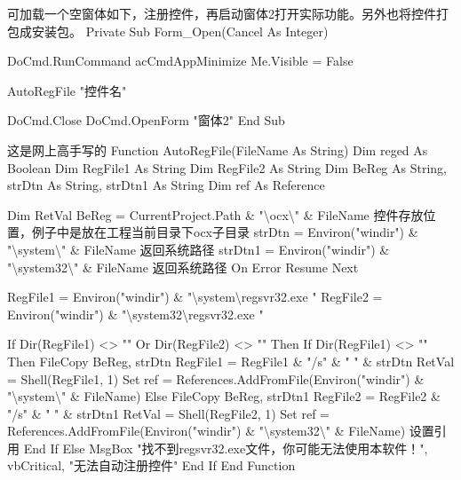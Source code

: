 \documentclass[
]{article}
\newenvironment{Shaded}{}{}
\newcommand{\NormalTok}[1]{#1}
\begin{document}
\begin{Shaded}
\begin{Highlighting}[]
\NormalTok{可加载一个空窗体如下，注册控件，再启动窗体2打开实际功能。另外也将控件打包成安装包。}
\NormalTok{Private Sub Form\_Open(Cancel As Integer)}

\NormalTok{    DoCmd.RunCommand acCmdAppMinimize}
\NormalTok{    Me.Visible = False}

\NormalTok{    AutoRegFile "控件名"}

\NormalTok{    DoCmd.Close}
\NormalTok{    DoCmd.OpenForm "窗体2"}
\NormalTok{End Sub}

\NormalTok{\textquotesingle{}这是网上高手写的}
\NormalTok{Function AutoRegFile(FileName As String)}
\NormalTok{    Dim reged As Boolean}
\NormalTok{    Dim RegFile1 As String}
\NormalTok{    Dim RegFile2 As String}
\NormalTok{    Dim BeReg As String, strDtn As String, strDtn1 As String}
\NormalTok{    Dim ref As Reference}

\NormalTok{    Dim RetVal}
\NormalTok{    BeReg = CurrentProject.Path \& "\textbackslash{}ocx\textbackslash{}" \& FileName          \textquotesingle{}控件存放位置，例子中是放在工程当前目录下ocx子目录}
\NormalTok{    strDtn = Environ("windir") \& "\textbackslash{}system\textbackslash{}" \& FileName           \textquotesingle{}返回系统路径}
\NormalTok{    strDtn1 = Environ("windir") \& "\textbackslash{}system32\textbackslash{}" \& FileName           \textquotesingle{}返回系统路径}
\NormalTok{    On Error Resume Next}

\NormalTok{    RegFile1 = Environ("windir") \& "\textbackslash{}system\textbackslash{}regsvr32.exe "}
\NormalTok{    RegFile2 = Environ("windir") \& "\textbackslash{}system32\textbackslash{}regsvr32.exe "}

\NormalTok{    If Dir(RegFile1) \textless{}\textgreater{} "" Or Dir(RegFile2) \textless{}\textgreater{} "" Then}
\NormalTok{        If Dir(RegFile1) \textless{}\textgreater{} "" Then}
\NormalTok{            FileCopy BeReg, strDtn}
\NormalTok{            RegFile1 = RegFile1 \& "/s" \& " " \& strDtn}
\NormalTok{            RetVal = Shell(RegFile1, 1)}
\NormalTok{\textquotesingle{}            Set ref = References.AddFromFile(Environ("windir") \& "\textbackslash{}system\textbackslash{}" \& FileName)}
\NormalTok{        Else}
\NormalTok{            FileCopy BeReg, strDtn1}
\NormalTok{            RegFile2 = RegFile2 \& "/s" \& " " \& strDtn1}
\NormalTok{            RetVal = Shell(RegFile2, 1)}
\NormalTok{\textquotesingle{}            Set ref = References.AddFromFile(Environ("windir") \& "\textbackslash{}system32\textbackslash{}" \& FileName)    \textquotesingle{}设置引用}
\NormalTok{        End If}
\NormalTok{    Else}
\NormalTok{        MsgBox "找不到regsvr32.exe文件，你可能无法使用本软件！", vbCritical, "无法自动注册控件"}
\NormalTok{    End If}
\NormalTok{End Function}
\end{Highlighting}
\end{Shaded}
\end{document}
